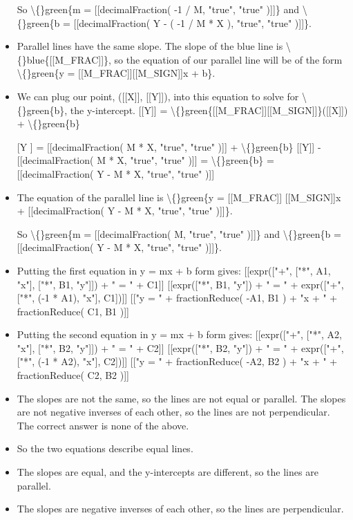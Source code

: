 \documentclass{article}
\begin{document}
\begin{itemize}
                        
                            So \textbackslash\{\}green\{m = [[decimalFraction( -1 / M, "true", "true" )]]\} and
                            \textbackslash\{\}green\{b = [[decimalFraction( Y - ( -1 / M * X ), "true", "true" )]]\}.
  \item Parallel lines have the same slope.
                        The slope of the blue line is \textbackslash\{\}blue\{[[M\_FRAC]]\}, so the equation of our parallel line will be of the form \textbackslash\{\}green\{y = [[M\_FRAC]][[M\_SIGN]]x + b\}.
  \item We can plug our point, ([[X]], [[Y]]), into this equation to solve for \textbackslash\{\}green\{b\}, the y-intercept.
                        [[Y]] = \textbackslash\{\}green\{[[M\_FRAC]][[M\_SIGN]]\}([[X]]) + \textbackslash\{\}green\{b\}
  \item [[Y]] = [[decimalFraction( M * X, "true", "true" )]] + \textbackslash\{\}green\{b\}
                        [[Y]] - [[decimalFraction( M * X, "true", "true" )]] = \textbackslash\{\}green\{b\} = [[decimalFraction( Y - M * X, "true", "true" )]]
  \item The equation of the parallel line is \textbackslash\{\}green\{y =
                            [[M\_FRAC]]
                            [[M\_SIGN]]x
                             + [[decimalFraction( Y - M * X, "true", "true" )]]\}.
                        
                        
                            So \textbackslash\{\}green\{m = [[decimalFraction( M, "true", "true" )]]\} and 
                            \textbackslash\{\}green\{b = [[decimalFraction( Y - M * X, "true", "true" )]]\}.
  \item Putting the first equation in y = mx + b form gives:
                        [[expr(["+", ["*", A1, "x"], ["*", B1, "y"]]) + " = " + C1]]
                        [[expr(["*", B1, "y"]) + " = " + expr(["+", ["*", (-1 * A1), "x"], C1])]]
                        [["y = " + fractionReduce( -A1, B1 ) + "x + " + fractionReduce( C1, B1 )]]
  \item Putting the second equation in y = mx + b form gives:
                        [[expr(["+", ["*", A2, "x"], ["*", B2, "y"]]) + " = " + C2]]
                        [[expr(["*", B2, "y"]) + " = " + expr(["+", ["*", (-1 * A2), "x"], C2])]]
                        [["y = " + fractionReduce( -A2, B2 ) + "x + " + fractionReduce( C2, B2 )]]
  \item The slopes are not the same, so the lines are not equal or parallel. The slopes are not negative inverses of each other, so the lines are not perpendicular. The correct answer is none of the above.
  \item So the two equations describe equal lines.
  \item The slopes are equal, and the y-intercepts are different, so the lines are parallel.
  \item The slopes are negative inverses of each other, so the lines are perpendicular.
\end{itemize}
\end{document}
